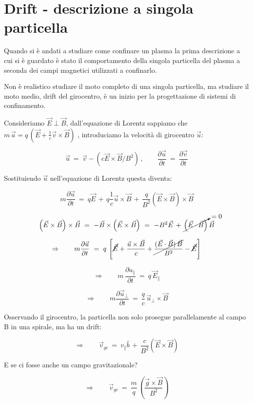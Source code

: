 \chapter{Drift - descrizione a singola particella}

Quando si è andati a studiare come confinare un plasma la prima descrizione a cui si è guardato è stato il comportamento della singola particella del plasma a seconda dei campi magnetici utilizzati a confinarlo.

Non è realistico studiare il moto completo di una singola particella, ma studiare il moto medio, drift del girocentro, è un inizio per la progettazione di sistemi di confinamento.

Consideriamo $\vec E\perp\vec B$, dall'equazione di Lorentz sappiamo che $m\,\vec a = q\,(\vec E + \frac{1}{c}\vec v \times \vec B)$ , introduciamo la velocità di girocentro $\vec u$:

\[ \vec u\ =\ \vec v - \left(c\vec E\times\vec B/B^2\right)\, ,\qquad \frac{\partial\vec{u}}{\partial t}\ =\ \frac{\partial\vec{v}}{\partial t}\]

Sostituiendo $\vec u$ nell'equazione di Lorentz questa diventa:

\[m \frac{\partial\vec{u}}{\partial t}\ =\ q\vec E\, +\, q \frac{1}{c} \vec u\times \vec B\, +\,  \frac{q}{B^2}\left(\vec E\times \vec B\right)\times \vec B \] 

\[ \left(\vec E\times \vec B\right)\times \vec B\ =\ -\vec B\times \left(\vec E\times \vec B\right)\ =\ -B^2\vec E\, +\, \cancelto{=0}{\left(\vec E\cdot \vec B\right)}\, \vec B \]

\[ \Rightarrow\qquad m\frac{\partial \vec{u}}{\partial t}\ =\ q\,\left[\cancel{\vec E} + \frac{\vec u\times \vec B}{c} + \cancel{\frac{(\vec E\cdot \vec B)\, \vec B}{B^2}} - \cancel{\vec E} \right] \]

\[ \Rightarrow \qquad m\, \frac{\partial u_{\parallel}}{\partial t} \ =\ q\, \vec E_{\parallel} \]

\[ \Rightarrow \qquad m \frac{\partial \vec u_{\perp}}{\partial t}\ =\  \frac{q}{c}\, \vec u_{\perp} \times \vec B \]

Osservando il girocentro, la particella non solo prosegue parallelamente al campo B in una spirale, ma ha un drift:

\[ \Rightarrow \qquad \vec v_{gc}\ =\ v_\parallel \hat b\, +\, \frac{c}{B^2} (\vec E\times \vec B) \]

E se ci fosse anche un campo gravitazionale?

\[ \Rightarrow\qquad \vec v_{gc}\ =\ \frac{m}{q}\, \left(\frac{\vec g\times \vec B}{B^2}\right) \]


